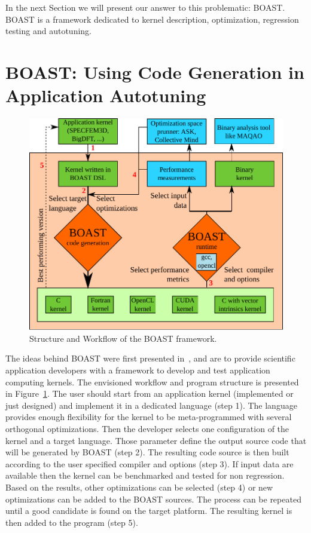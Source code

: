 \documentclass[11pt, a4paper, twoside]{montblanc}
\begin{document}
In the next Section we will present our answer to this problematic: BOAST.
BOAST is a framework dedicated to kernel description, optimization, regression testing
and autotuning.

\section{BOAST: Using Code Generation in Application Autotuning}

\begin{figure}
\begin{center}
\includegraphics[width=\textwidth]{BOAST_Workflow.pdf}
\caption{Structure and Workflow of the BOAST framework.}
\label{fig:boast_workflow}
\end{center}
\end{figure}

The ideas behind BOAST were first presented in~\cite{videau2013boast}, and are
to provide scientific application developers with a framework to develop and
test application computing kernels. The envisioned workflow and program
structure is presented in Figure~\ref{fig:boast_workflow}.  The user should
start from an application kernel (implemented or just designed) and implement it
in a dedicated language (step 1). The language provides enough flexibility for
the kernel to be meta-programmed with several orthogonal optimizations. Then the
developer selects one configuration of the kernel and a target language. Those
parameter define the output source code that will be generated by BOAST (step
2). The resulting code source is then built according to the user specified
compiler and options (step 3). If input data are available then the kernel can
be benchmarked and tested for non regression. Based on the results, other
optimizations can be selected (step 4) or new optimizations can be added to the
BOAST sources. The process can be repeated until a good candidate is found on
the target platform. The resulting kernel is then added to the program (step 5).
\end{document}
